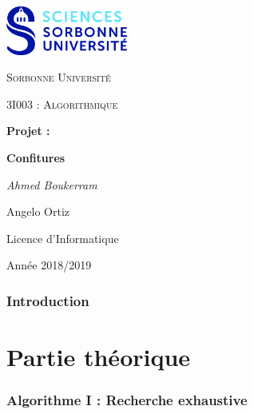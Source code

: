 \documentclass[12pt,a4paper]{article}
\begin{document}
\begin{titlepage}
	\centering
	\includegraphics[width=0.30\textwidth]{logo.jpg}\par\vspace{1cm}
	{\scshape\LARGE Sorbonne Universit\'e \par}
	\vspace{1cm}
	{\scshape\Large 3I003 : Algorithmique\par}
	\vspace{1.5cm}
	{\Large \bfseries Projet :\par}
	{\huge\bfseries Confitures\par}
	\vspace{2cm}
	{\Large\itshape Ahmed Boukerram \par Angelo Ortiz\par}
	
	\vfill

	{\large Licence d'Informatique\par}
	{\large Ann\'ee 2018/2019\par}
\end{titlepage}




\tableofcontents

\newpage

\section{Introduction}



\newpage
\part{Partie th\'eorique}

\section{Algorithme I : Recherche exhaustive}
\end{document}
